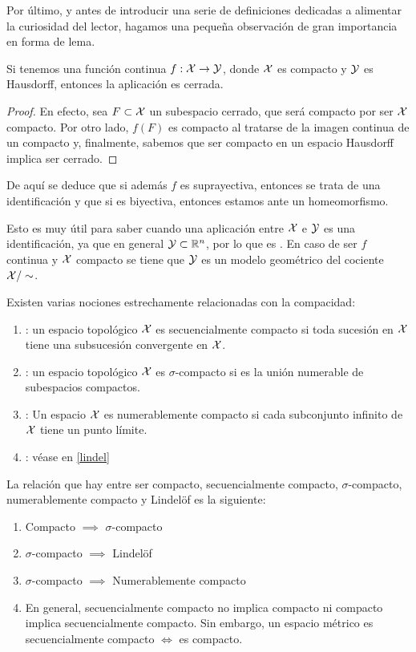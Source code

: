 Por último, y antes de introducir una serie de definiciones dedicadas a alimentar la curiosidad del lector, hagamos una pequeña observación de gran importancia en forma de lema.

\begin{lem}
	Si tenemos una función continua $f: \mathcal{X}\to \mathcal{Y}$, donde $\mathcal{X}$ es compacto y $\mathcal{Y}$ es Hausdorff, entonces la aplicación es cerrada.
\end{lem}
\begin{proof}
	En efecto, sea $F\subset \mathcal{X}$ un subespacio cerrado, que será compacto por ser $\mathcal{X}$ compacto. Por otro lado, $f(F)$ es compacto al tratarse de la imagen continua de un compacto y, finalmente, sabemos que ser compacto en un espacio Hausdorff implica ser cerrado.
\end{proof}

De aquí se deduce que si además $f$ es suprayectiva, entonces se trata de una identificación y que si es biyectiva, entonces estamos ante un homeomorfismo. 

Esto es muy útil para saber cuando una aplicación entre $\mathcal{X}$ e $\mathcal{Y}$ es una identificación, ya que en general $\mathcal{Y}\subset\mathbb{R}^n$, por lo que es \hausdorff. En caso de ser $f$ continua y $\mathcal{X}$ compacto se tiene que $\mathcal{Y}$ es un modelo geométrico del cociente $\mathcal{X}/\sim$.

\begin{defi}[Definiciones] Existen varias nociones estrechamente relacionadas con la compacidad:
	\begin{enumerate}
		\item {}: un espacio topológico	$\mathcal{X}$ es secuencialmente compacto si toda sucesión en $\mathcal{X}$ tiene una subsucesión convergente en $\mathcal{X}$.
		\item {}:  un espacio topológico $\mathcal{X}$ es $\sigma$-compacto si es la unión numerable de subespacios compactos.
		\item {}: Un espacio $\mathcal{X}$ es numerablemente compacto si cada subconjunto infinito de $\mathcal{X}$ tiene un punto límite.
		\item {}: véase en \ref{lindel}
	\end{enumerate}
\end{defi}

\begin{obs}
	\label{comp_obs_relacion_defs_compacidad}
	La relación que hay entre ser compacto, secuencialmente compacto, $\sigma$-compacto, numerablemente compacto y Lindelöf es la siguiente:
	\begin{enumerate}
		\item Compacto $\implies$ $\sigma$-compacto
		\item $\sigma$-compacto $\implies$ Lindelöf
		\item $\sigma$-compacto $\implies$ Numerablemente compacto
		\item En general, secuencialmente compacto no implica compacto ni compacto implica secuencialmente compacto. Sin embargo, un espacio métrico es secuencialmente compacto $\iff$ es compacto. \qedhere
	\end{enumerate}
\end{obs}

